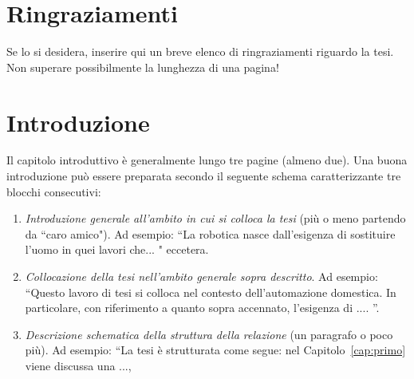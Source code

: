 \chapter*{Ringraziamenti}

Se lo si desidera, inserire qui un breve elenco di ringraziamenti riguardo la tesi.\\

Non superare possibilmente la lunghezza di una pagina!


\chapter*{Introduzione}

Il capitolo introduttivo \`e generalmente lungo tre pagine (almeno due). 
Una buona introduzione pu\`o essere preparata secondo il seguente schema caratterizzante tre blocchi consecutivi: 
\begin{enumerate}
\item {\em Introduzione generale all'ambito in cui si colloca la tesi} (pi\`u o meno partendo da ``caro amico"). Ad esempio: ``La robotica nasce dall'esigenza di sostituire l'uomo in quei lavori che... " eccetera.

\item {\em Collocazione della tesi nell'ambito generale sopra descritto}. Ad esempio: ``Questo lavoro di tesi si colloca nel contesto dell'automazione domestica. In particolare, con riferimento a quanto sopra accennato, l'esigenza di .... ''.

\item {\em Descrizione schematica della struttura della relazione} (un paragrafo o poco pi\`u). Ad esempio: ``La tesi \`e strutturata come segue: nel Capitolo~\ref{cap:primo} viene discussa una ..., 

\end{enumerate}

